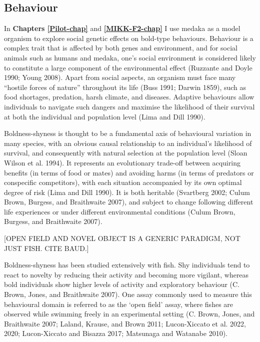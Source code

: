 \documentclass[
]{book}
\begin{document}
\hypertarget{behaviour}{%
\subsection{Behaviour}\label{behaviour}}

In \textbf{Chapters \ref{Pilot-chap}} and \textbf{\ref{MIKK-F2-chap}} I use medaka as a model organism to explore social genetic effects on bold-type behaviours. Behaviour is a complex trait that is affected by both genes and environment, and for social animals such as humans and medaka, one's social environment is considered likely to constitute a large component of the environmental effect (Ruzzante and Doyle 1990; Young 2008). Apart from social aspects, an organism must face many ``hostile forces of nature'' throughout its life (Buss 1991; Darwin 1859), such as food shortages, predation, harsh climate, and diseases. Adaptive behaviours allow individuals to navigate such dangers and maximise the likelihood of their survival at both the individual and population level (Lima and Dill 1990).

Boldness-shyness is thought to be a fundamental axis of behavioural variation in many species, with an obvious causal relationship to an individual's likelihood of survival, and consequently with natural selection at the population level (Sloan Wilson et al. 1994). It represents an evolutionary trade-off between acquiring benefits (in terms of food or mates) and avoiding harms (in terms of predators or conspecific competitors), with each situation accompanied by its own optimal degree of risk (Lima and Dill 1990). It is both heritable (Svartberg 2002; Culum Brown, Burgess, and Braithwaite 2007), and subject to change following different life experiences or under different environmental conditions (Culum Brown, Burgess, and Braithwaite 2007).

{[}OPEN FIELD AND NOVEL OBJECT IS A GENERIC PARADIGM, NOT JUST FISH. CITE BAUD.{]}

Boldness-shyness has been studied extensively with fish. Shy individuals tend to react to novelty by reducing their activity and becoming more vigilant, whereas bold individuals show higher levels of activity and exploratory behaviour (C. Brown, Jones, and Braithwaite 2007). One assay commonly used to measure this behavioural domain is referred to as the `open field' assay, where fishes are observed while swimming freely in an experimental setting (C. Brown, Jones, and Braithwaite 2007; Laland, Krause, and Brown 2011; Lucon-Xiccato et al. 2022, 2020; Lucon-Xiccato and Bisazza 2017; Matsunaga and Watanabe 2010).
\end{document}
